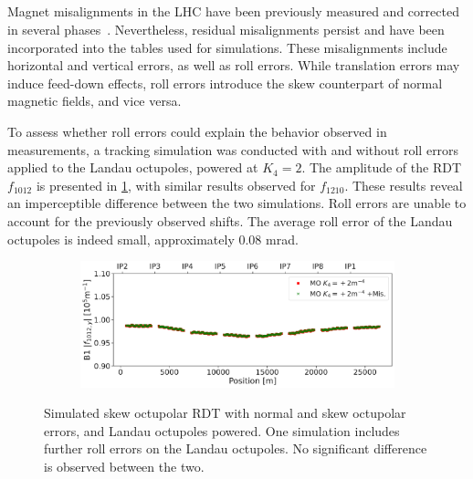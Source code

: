 \FloatBarrier
\subsection{}

Magnet misalignments in the LHC have been previously measured and corrected in several
phases~\cite{missiaen_final_2008}. Nevertheless, residual misalignments persist and have been
incorporated into the tables used for simulations. These misalignments include horizontal and
vertical errors, as well as roll errors. While translation errors may induce feed-down effects,
roll errors introduce the skew counterpart of normal magnetic fields, and vice versa.

To assess whether roll errors could explain the behavior observed in measurements, a tracking
simulation was conducted with and without roll errors applied to the Landau octupoles, powered at 
$K_4 = 2$. The amplitude of the RDT $f_{1012}$ is presented in
\cref{fig:skew_octupolar:sim_misalign}, with similar results observed for $f_{1210}$. These
results reveal an imperceptible difference between the two simulations.
Roll errors are unable to account for the previously observed shifts. The average roll error of
the Landau octupoles is indeed small, approximately $0.08$ mrad.

\begin{figure}[!htb]
    \centering
    \begin{subfigure}{0.8\textwidth}
        \includegraphics[width=\textwidth]{./images/skew_octupoles/f1012_misalign_AMP.pdf}
    \end{subfigure}
    \caption{Simulated skew octupolar RDT with normal and skew octupolar errors, and Landau
    octupoles powered. One simulation includes further roll errors on the Landau octupoles. No 
    significant difference is observed between the two.} 
    \label{fig:skew_octupolar:sim_misalign}
\end{figure}



